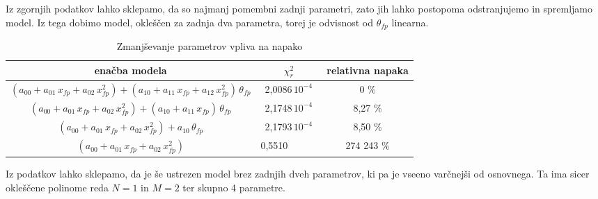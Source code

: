 Iz zgornjih podatkov lahko sklepamo, da so najmanj pomembni zadnji parametri, zato jih lahko postopoma odstranjujemo in spremljamo model. Iz tega dobimo model, okleščen za zadnja dva parametra, torej je odvisnost od $\theta_{fp}$ linearna.

\begin{table}[ht]
    \centering
    \begin{tabular}{c|c|c}
        enačba modela & $\chi_r^2$ & relativna napaka \\
        \hline
        $(a_{00} + a_{01}\,x_{fp} + a_{02}\,x_{fp}^2) + (a_{10} + a_{11}\,x_{fp} + a_{12}\,x_{fp}^2)\,\theta_{fp}$ & 2,0086$\,10^{-4}$ & 0 \% \\
        $(a_{00} + a_{01}\,x_{fp} + a_{02}\,x_{fp}^2) + (a_{10} + a_{11}\,x_{fp})\,\theta_{fp}$ & 2,1748$\,10^{-4}$ & 8,27 \% \\
        $(a_{00} + a_{01}\,x_{fp} + a_{02}\,x_{fp}^2) + a_{10}\,\theta_{fp}$ & 2,1793$\,10^{-4}$ & 8,50 \% \\
        $(a_{00} + a_{01}\,x_{fp} + a_{02}\,x_{fp}^2)$ & 0,5510~~~~~~ & 274 243 \% \\
    \end{tabular}
    \caption{Zmanjševanje parametrov vpliva na napako}
\end{table}

Iz podatkov lahko sklepamo, da je še ustrezen model brez zadnjih dveh parametrov, ki pa je vseeno varčnejši od osnovnega. Ta ima sicer okleščene polinome reda $N=1$ in $M=2$ ter skupno 4 parametre.